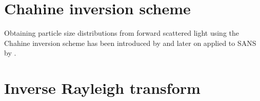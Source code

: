 \begin{algorithm}[thb]
\begin{algorithmic}[1]
\EndWhile
\EndProcedure
\end{algorithmic}
\end{algorithm}

\section{Chahine inversion scheme}
Obtaining particle size distributions from forward scattered light using the Chahine inversion scheme has been introduced by \cite{Santer1983} and later on applied to SANS by \cite{Sen2014}.

\section{Inverse Rayleigh transform} 
